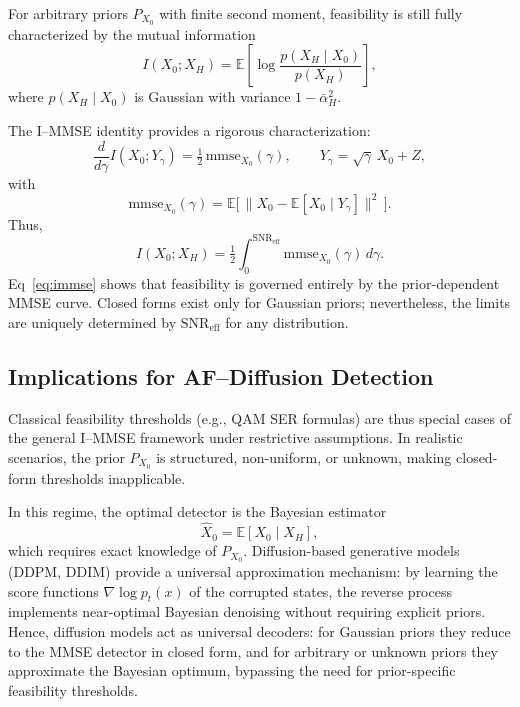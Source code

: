 \documentclass[journal]{IEEEtran}
\begin{document}
For arbitrary priors $P_{X_0}$ with finite second moment, feasibility is still fully characterized by the mutual information
\begin{equation}
    I(X_0;X_H) = \mathbb{E}\!\left[
        \log \frac{p(X_H \mid X_0)}{p(X_H)}
    \right],
\end{equation}
where $p(X_H \mid X_0)$ is Gaussian with variance $1-\bar\alpha_H^2$.  

The I--MMSE identity \cite{Guo2005I_MMSE} provides a rigorous characterization:
\begin{equation}
    \frac{d}{d\gamma} I(X_0;Y_\gamma)
    = \tfrac{1}{2}\,\mathrm{mmse}_{X_0}(\gamma),
    \qquad Y_\gamma = \sqrt{\gamma}\,X_0+Z,
    \label{eq:immse}
\end{equation}
with
\begin{equation}
    \mathrm{mmse}_{X_0}(\gamma)
    = \mathbb{E}\!\Big[\,
        \|X_0-\mathbb{E}[X_0 \mid Y_\gamma]\|^2
    \,\Big].
\end{equation}
Thus,
\begin{equation}
    I(X_0;X_H) = \tfrac{1}{2}\int_0^{\mathrm{SNR}_{\mathrm{eff}}} 
    \mathrm{mmse}_{X_0}(\gamma)\, d\gamma.
\end{equation}
Eq~\eqref{eq:immse} shows that feasibility is governed entirely by the prior-dependent MMSE curve. 
Closed forms exist only for Gaussian priors; nevertheless, the limits are uniquely determined by $\mathrm{SNR}_{\mathrm{eff}}$ for any distribution.

\subsection{Implications for AF--Diffusion Detection}

Classical feasibility thresholds (e.g., QAM SER formulas) are thus special cases of the general I--MMSE framework under restrictive assumptions.  
In realistic scenarios, the prior $P_{X_0}$ is structured, non-uniform, or unknown, making closed-form thresholds inapplicable.  

In this regime, the optimal detector is the Bayesian estimator
\begin{equation}
    \hat{X}_0 = \mathbb{E}[X_0 \mid X_H],
\end{equation}
which requires exact knowledge of $P_{X_0}$. Diffusion-based generative models (DDPM, DDIM) provide a universal approximation mechanism: by learning the score functions $\nabla \log p_t(x)$ of the corrupted states, the reverse process implements near-optimal Bayesian denoising without requiring explicit priors.  
Hence, diffusion models act as universal decoders: for Gaussian priors they reduce to the MMSE detector in closed form, and for arbitrary or unknown priors they approximate the Bayesian optimum, bypassing the need for prior-specific feasibility thresholds.
\end{document}
